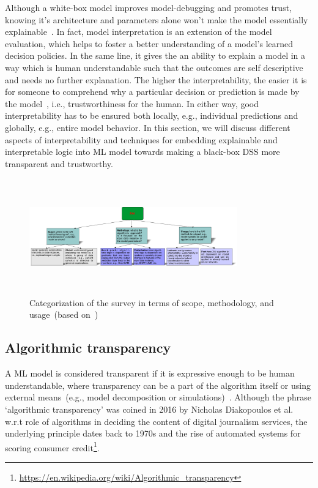 \hspace*{3.5mm} Although a white-box model improves model-debugging and promotes trust, knowing it's architecture and parameters alone won't make the model essentially explainable~\cite{das2020opportunities}. In fact, model interpretation is an extension of the model evaluation, which helps to foster a better understanding of a model’s learned decision policies. In the same line, it gives the an ability to explain a model in a way which is human understandable such that the outcomes are self descriptive and needs no further explanation. The higher the interpretability, the easier it is for someone to comprehend why a particular decision or prediction is made by the model~\cite{stiglic2020interpretability,bhatt2020explainable}, i.e., trustworthiness for the human. In either way, good interpretability has to be ensured both locally, e.g., individual predictions and globally, e.g., entire model behavior. In this section, we will discuss different aspects of interpretability and techniques for embedding explainable and interpretable logic into ML model towards making a black-box DSS more transparent and trustworthy. 

\begin{figure}[h]
	\centering
	\includegraphics[width=0.8\textwidth,height=50mm]{images/xai_tec.png}	
    \caption{Categorization of the survey in terms of scope, methodology, and usage~(based on~\cite{das2020opportunities})}	
	\label{fig:survey_xai}
\end{figure}

\subsection{Algorithmic transparency}
A ML model is considered transparent if it is expressive enough to be human understandable, where transparency can be a part of the algorithm itself or using external means~(e.g., model
decomposition or simulations)~\cite{das2020opportunities}. 
Although the phrase `algorithmic transparency' was coined in 2016 by Nicholas Diakopoulos et al.~\cite{diakopoulos2017algorithmic} w.r.t role of algorithms in deciding the content of digital journalism services, the underlying principle dates back to 1970s and the rise of automated systems for scoring consumer credit\footnote{\url{https://en.wikipedia.org/wiki/Algorithmic_transparency}}. 


